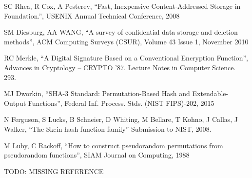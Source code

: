 \documentclass{llncs}
\begin{document}
\begin{thebibliography}{1}

 SC Rhea, R Cox, A Pesterev, ``Fast, Inexpensive 
Content-Addressed Storage in Foundation.'', USENIX Annual Technical 
Conference, 2008

 SM Diesburg, AA WANG, ``A survey of confidential data 
storage and deletion methods'', ACM Computing Surveys (CSUR), Volume 43 
Issue 1, November 2010

 RC Merkle, ``A Digital Signature Based on a Conventional 
Encryption Function'', Advances in Cryptology -- CRYPTO '87. Lecture 
Notes in Computer Science. 293.

 MJ Dworkin, ``SHA-3 Standard: Permutation-Based Hash and 
Extendable-Output Functions'', Federal Inf. Process. Stds. (NIST 
FIPS)-202, 2015

 N Ferguson, S Lucks, B Schneier, D Whiting, M 
Bellare, T Kohno, J Callas, J Walker, ``The Skein hash function family'' 
Submission to NIST, 2008.

 M Luby, C Rackoff, ``How to construct pseudorandom 
permutations from pseudorandom functions'', SIAM Journal on Computing, 1988

 {\bb TODO: MISSING REFERENCE}

\end{thebibliography}
\end{document}

